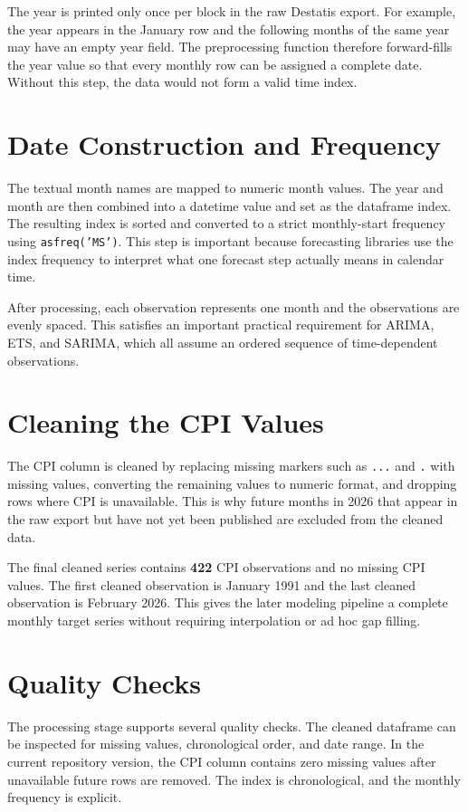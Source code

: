 The year is printed only once per block in the raw Destatis export. For example, the year appears in the January row and the following months of the same year may have an empty year field. The preprocessing function therefore forward-fills the year value so that every monthly row can be assigned a complete date. Without this step, the data would not form a valid time index.

\section{Date Construction and Frequency}

The textual month names are mapped to numeric month values. The year and month are then combined into a datetime value and set as the dataframe index. The resulting index is sorted and converted to a strict monthly-start frequency using \texttt{asfreq('MS')}. This step is important because forecasting libraries use the index frequency to interpret what one forecast step actually means in calendar time.

After processing, each observation represents one month and the observations are evenly spaced. This satisfies an important practical requirement for ARIMA, ETS, and SARIMA, which all assume an ordered sequence of time-dependent observations.

\section{Cleaning the CPI Values}

The CPI column is cleaned by replacing missing markers such as \texttt{...} and \texttt{.} with missing values, converting the remaining values to numeric format, and dropping rows where CPI is unavailable. This is why future months in 2026 that appear in the raw export but have not yet been published are excluded from the cleaned data.

The final cleaned series contains \textbf{422} CPI observations and no missing CPI values. The first cleaned observation is January 1991 and the last cleaned observation is February 2026. This gives the later modeling pipeline a complete monthly target series without requiring interpolation or ad hoc gap filling.

\section{Quality Checks}

The processing stage supports several quality checks. The cleaned dataframe can be inspected for missing values, chronological order, and date range. In the current repository version, the CPI column contains zero missing values after unavailable future rows are removed. The index is chronological, and the monthly frequency is explicit.

